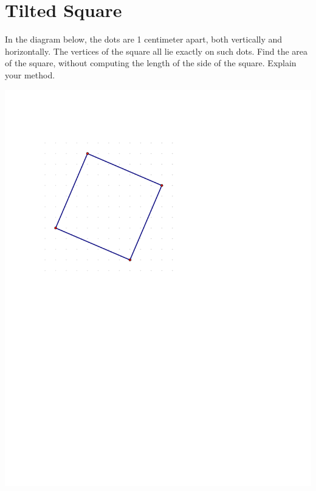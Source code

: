 \newpage

\section{Tilted Square}

\begin{prob}
In the diagram below, the dots are 1 centimeter apart, both vertically and horizontally.  The vertices of the square all lie exactly on such dots. Find the area of the square, without computing the length of the side of the square.  Explain your method.  

\includegraphics{../graphics/tiltedSquare}

\end{prob}
